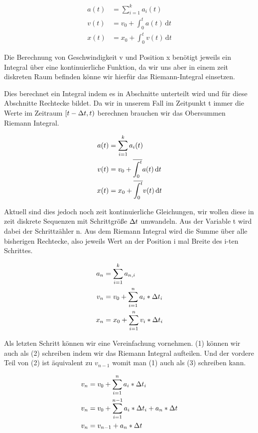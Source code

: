 \begin{align*}
  a(t) &= \sum_{i=1}^{k}{a_i(t)}  \\
  v(t) &= v_0 + \int_0^t {a(t)}\,\mathrm{d}t  \\
  x(t) &= x_0 + \int_0^t {v(t)}\,\mathrm{d}t
\end{align*}

Die Berechnung von Geschwindigkeit v und Position x benötigt jeweils ein Integral über eine kontinuierliche Funktion, da wir uns aber in einem zeit diskreten Raum befinden könne wir hierfür das Riemann-Integral einsetzen. %



Dies berechnet ein Integral indem es in Abschnitte unterteilt wird und für diese Abschnitte Rechtecke bildet. Da wir in unserem Fall im Zeitpunkt t immer die Werte im Zeitraum $[t - \Delta t , t)$ berechnen brauchen wir das Obersummen Riemann Integral.

\begin{align*}
  a(t) &= \sum_{i=1}^{k}{a_i(t)}  \\
  v(t) &= v_0 + \overline{\int_{0}^{t}} a(t)\,\mathrm{d}t  \\
  x(t) &= x_0 + \overline{\int_{0}^{t}} v(t)\,\mathrm{d}t
\end{align*}

Aktuell sind dies jedoch noch zeit kontinuierliche Gleichungen, wir wollen diese in zeit diskrete Sequenzen mit Schrittgröße $\Delta t$ umwandeln. Aus der Variable t wird dabei der Schrittzähler n. Aus dem Riemann Integral wird die Summe über alle bisherigen Rechtecke, also jeweils Wert an der Position i mal Breite des i-ten Schrittes.

\begin{align*}
  a_n &= \sum_{i=1}^{k}{a_{n, i}}  \\
  v_n &= v_0 + \sum_{i=1}^{n}{a_i * \Delta t_i}  \\
  x_n &= x_0 + \sum_{i=1}^{n}{v_i * \Delta t_i}
\end{align*}

Als letzten Schritt können wir eine Vereinfachung vornehmen. (1) können wir auch als (2) schreiben indem wir das Riemann Integral aufteilen. Und der vordere Teil von (2) ist äquivalent zu $v_{n-1}$ womit man (1) auch als (3) schreiben kann. 

\begin{align}
  v_n &= v_0 + \sum_{i=1}^{n}{a_i * \Delta t_i}  \\
  v_n &= v_0 + \sum_{i=1}^{n-1}{a_i * \Delta t_i} + a_n * \Delta t  \\
  v_n &= v_{n-1} + a_n * \Delta t
\end{align}

